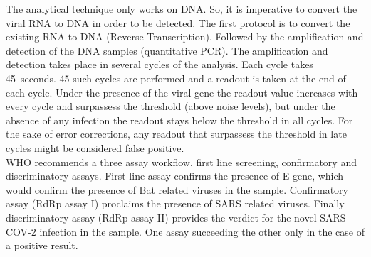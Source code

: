 \documentclass[fleqn,10pt]{wlscirep}
\begin{document}
The analytical technique only works on DNA. So, it is imperative to convert the viral RNA to DNA in order to be detected. The first protocol is to convert the existing RNA to DNA (Reverse Transcription). Followed by the amplification and detection of the DNA samples (quantitative PCR). The amplification and detection takes place in several cycles of the analysis. Each cycle takes \SI{45}{seconds}. 45 such cycles are performed and a readout is taken at the end of each cycle. Under the presence of the viral gene the readout value increases with every cycle and surpassess the threshold (above noise levels), but under the absence of any infection the readout stays below the threshold in all cycles. For the sake of error corrections, any readout that surpassess the threshold in late cycles might be considered false positive.\\

WHO recommends a three assay workflow, first line screening, confirmatory and discriminatory assays. First line assay confirms the presence of E gene, which would confirm the presence of Bat related viruses in the sample. Confirmatory assay (RdRp assay I) proclaims the presence of SARS related viruses. Finally discriminatory assay (RdRp assay II) provides the verdict for the novel SARS-COV-2 infection in the sample. One assay succeeding the other only in the case of a positive result.\\
\end{document}
